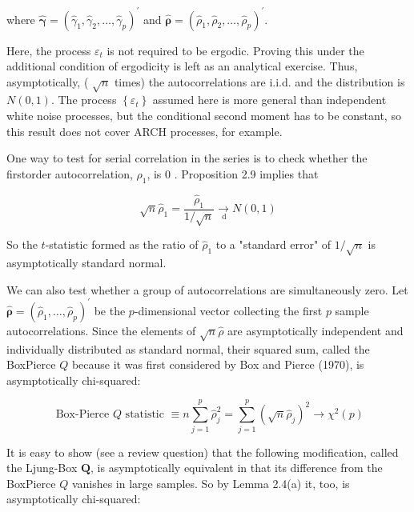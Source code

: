 \documentclass[10pt]{article}
\begin{document}
where $\hat{\boldsymbol{\gamma}}=\left(\hat{\gamma}_{1}, \hat{\gamma}_{2}, \ldots, \hat{\gamma}_{p}\right)^{\prime}$ and $\hat{\boldsymbol{\rho}}=\left(\hat{\rho}_{1}, \hat{\rho}_{2}, \ldots, \hat{\rho}_{p}\right)^{\prime}$.

Here, the process $\varepsilon_{t}$ is not required to be ergodic. Proving this under the additional condition of ergodicity is left as an analytical exercise. Thus, asymptotically, ( $\sqrt{n}$ times) the autocorrelations are i.i.d. and the distribution is $N(0,1)$. The process $\left\{\varepsilon_{t}\right\}$ assumed here is more general than independent white noise processes, but the conditional second moment has to be constant, so this result does not cover ARCH processes, for example.

One way to test for serial correlation in the series is to check whether the firstorder autocorrelation, $\rho_{1}$, is 0 . Proposition 2.9 implies that


\begin{equation*}
\sqrt{n} \hat{\rho}_{1}=\frac{\hat{\rho}_{1}}{1 / \sqrt{n}} \underset{\mathrm{~d}}{\rightarrow} N(0,1) \tag{2.10.3}
\end{equation*}


So the $t$-statistic formed as the ratio of $\hat{\rho}_{1}$ to a "standard error" of $1 / \sqrt{n}$ is asymptotically standard normal.

We can also test whether a group of autocorrelations are simultaneously zero. Let $\hat{\boldsymbol{\rho}}=\left(\hat{\rho}_{1}, \ldots, \hat{\rho}_{p}\right)^{\prime}$ be the $p$-dimensional vector collecting the first $p$ sample autocorrelations. Since the elements of $\sqrt{n} \hat{\rho}$ are asymptotically independent and individually distributed as standard normal, their squared sum, called the BoxPierce $Q$ because it was first considered by Box and Pierce (1970), is asymptotically chi-squared:


\begin{equation*}
\text { Box-Pierce } Q \text { statistic } \equiv n \sum_{j=1}^{p} \hat{\rho}_{j}^{2}=\sum_{j=1}^{p}\left(\sqrt{n} \hat{\rho}_{j}\right)^{2} \rightarrow \chi^{2}(p) \tag{2.10.4}
\end{equation*}


It is easy to show (see a review question) that the following modification, called the Ljung-Box $\boldsymbol{Q}$, is asymptotically equivalent in that its difference from the BoxPierce $Q$ vanishes in large samples. So by Lemma 2.4(a) it, too, is asymptotically chi-squared:
\end{document}
